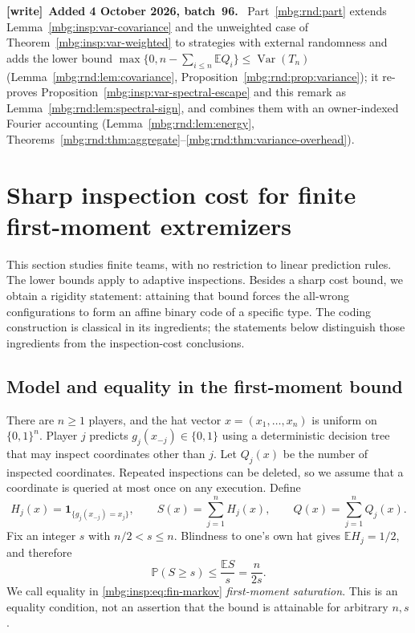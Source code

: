 \documentclass[11pt,letterpaper]{article}
\theoremstyle{definition}
\newcommand{\E}{\mathbb E}
\newcommand{\Prb}{\mathbb P}
\newcommand{\indic}[1]{\mathbf 1_{\{#1\}}}
\DeclareMathOperator{\Var}{Var}
\newenvironment{writenote}[1][]{\par\smallskip\begingroup\small
 \noindent\textbf{[write]}\if\relax\detokenize{#1}\relax\else~\textbf{#1.}\fi\ }%
 {\par\endgroup\smallskip}
\begin{document}
\begin{writenote}[Added 4 October 2026, batch~96]
Part~\ref{mbg:rnd:part} extends Lemma~\ref{mbg:insp:var-covariance} and the unweighted case of Theorem~\ref{mbg:insp:var-weighted} to strategies with external randomness and adds the lower bound $\max\{0,n-\sum_{i\le n}\E Q_i\}\le\Var(T_n)$ (Lemma~\ref{mbg:rnd:lem:covariance}, Proposition~\ref{mbg:rnd:prop:variance}); it re-proves Proposition~\ref{mbg:insp:var-spectral-escape} and this remark as Lemma~\ref{mbg:rnd:lem:spectral-sign}, and combines them with an owner-indexed Fourier accounting (Lemma~\ref{mbg:rnd:lem:energy}, Theorems~\ref{mbg:rnd:thm:aggregate}--\ref{mbg:rnd:thm:variance-overhead}).
\end{writenote}


\section{Sharp inspection cost for finite first-moment extremizers}
\label{mbg:insp:sec:fin}

This section studies finite teams, with no restriction to linear prediction
rules.  The lower bounds apply to adaptive inspections.  Besides a sharp
cost bound, we obtain a rigidity statement: attaining that bound forces the
all-wrong configurations to form an affine binary code of a specific type.
The coding construction is classical in its ingredients; the statements
below distinguish those ingredients from the inspection-cost conclusions.

\subsection{Model and equality in the first-moment bound}

There are $n\geq1$ players, and the hat vector
$x=(x_1,\ldots,x_n)$ is uniform on $\{0,1\}^n$.  Player $j$ predicts
$g_j(x_{-j})\in\{0,1\}$ using a deterministic decision tree that may inspect
coordinates other than $j$.  Let $Q_j(x)$ be the number of inspected
coordinates.  Repeated inspections can be deleted, so we assume that a
coordinate is queried at most once on any execution.  Define
\[
 H_j(x)=\indic{g_j(x_{-j})=x_j},\qquad
 S(x)=\sum_{j=1}^nH_j(x),\qquad
 Q(x)=\sum_{j=1}^n Q_j(x).
\]
Fix an integer $s$ with $n/2<s\leq n$.  Blindness to one's own hat gives
$\E H_j=1/2$, and therefore
\begin{equation}
 \Prb(S\geq s)\leq \frac{\E S}{s}=\frac{n}{2s}.
 \label{mbg:insp:eq:fin-markov}
\end{equation}
We call equality in \eqref{mbg:insp:eq:fin-markov} \emph{first-moment saturation}.
This is an equality condition, not an assertion that the bound is
attainable for arbitrary $n,s$.
\end{document}

